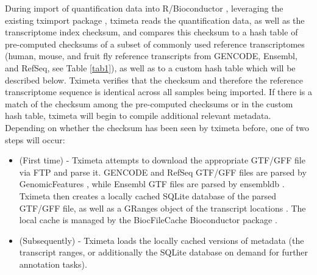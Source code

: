 \documentclass[12pt]{article} \usepackage[utf8]{inputenc}
\begin{document}
During import of quantification data into R/Bioconductor
\citep{bioc}, leveraging the existing tximport package
\citep{tximport}, tximeta reads the quantification data, as well as
the transcriptome index checksum, and compares this checksum to a hash
table of pre-computed checksums of a subset of commonly used reference
transcriptomes (human, mouse, and fruit fly reference transcripts from
GENCODE, Ensembl, and RefSeq, see Table \ref{tab1}), as well as to a
custom hash table which will be described below. Tximeta verifies that
the checksum and therefore the reference transcriptome sequence is
identical across all samples being imported. If there is a match of
the checksum among the pre-computed checksums or in the custom hash table,
tximeta will begin to compile additional relevant
metadata. Depending on whether the checksum has been seen by tximeta
before, one of two steps will occur:

\begin{itemize}
\item (First time) - Tximeta attempts to download the appropriate GTF/GFF
  file via FTP and parse it. GENCODE and RefSeq GTF/GFF files are parsed
  by GenomicFeatures \citep{granges}, while Ensembl GTF files are
  parsed by ensembldb \citep{ensembldb}. Tximeta then creates a
  locally cached SQLite database of the parsed GTF/GFF file, as well as a
  GRanges object of the transcript locations \citep{granges}. The
  local cache is managed by the BiocFileCache Bioconductor package
  \citep{biocfilecache}.
\item (Subsequently) - Tximeta loads the locally cached versions of
  metadata (the transcript ranges, or additionally the SQLite database
  on demand for further annotation tasks).
\end{itemize}
\end{document}
